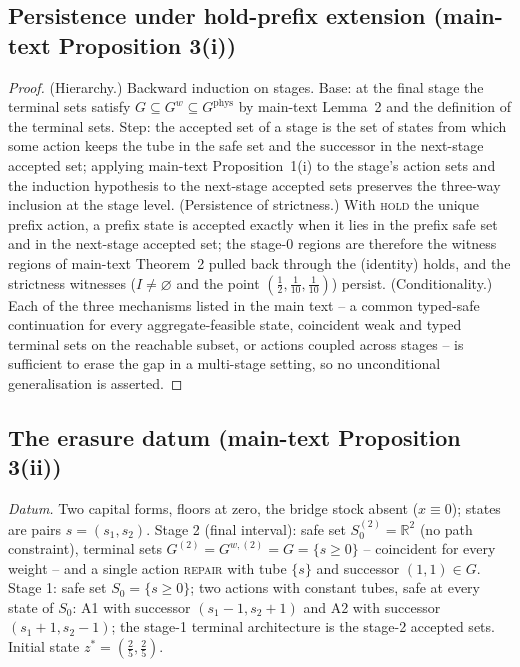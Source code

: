 \documentclass[preprint,11pt,authoryear]{elsarticle}
\theoremstyle{remark}
\newcommand{\act}[1]{\textsc{#1}}
\begin{document}
\subsection{Persistence under hold-prefix extension (main-text Proposition 3(i))}

\begin{proof}
(Hierarchy.) Backward induction on stages. Base: at the final stage the terminal sets satisfy $G\subseteq G^w\subseteq G^{\mathrm{phys}}$ by main-text Lemma~2 and the definition of the terminal sets. Step: the accepted set of a stage is the set of states from which some action keeps the tube in the safe set and the successor in the next-stage accepted set; applying main-text Proposition~1(i) to the stage's action sets and the induction hypothesis to the next-stage accepted sets preserves the three-way inclusion at the stage level.
(Persistence of strictness.) With \act{hold} the unique prefix action, a prefix state is accepted exactly when it lies in the prefix safe set and in the next-stage accepted set; the stage-0 regions are therefore the witness regions of main-text Theorem~2 pulled back through the (identity) holds, and the strictness witnesses ($I\neq\varnothing$ and the point $(\tfrac12,\tfrac1{10},\tfrac1{10})$) persist.
(Conditionality.) Each of the three mechanisms listed in the main text -- a common typed-safe continuation for every aggregate-feasible state, coincident weak and typed terminal sets on the reachable subset, or actions coupled across stages -- is sufficient to erase the gap in a multi-stage setting, so no unconditional generalisation is asserted.
\end{proof}

\subsection{The erasure datum (main-text Proposition 3(ii))}\label{si:erasure}

\emph{Datum.} Two capital forms, floors at zero, the bridge stock absent ($x\equiv0$); states are pairs $s=(s_1,s_2)$. Stage 2 (final interval): safe set $S_0^{(2)}=\mathbb R^2$ (no path constraint), terminal sets $G^{(2)}=G^{w,(2)}=G=\{s\ge0\}$ -- coincident for every weight -- and a single action \act{repair} with tube $\{s\}$ and successor $(1,1)\in G$. Stage 1: safe set $S_0=\{s\ge0\}$; two actions with constant tubes, safe at every state of $S_0$: A1 with successor $(s_1-1,s_2+1)$ and A2 with successor $(s_1+1,s_2-1)$; the stage-1 terminal architecture is the stage-2 accepted sets. Initial state $z^*=(\tfrac25,\tfrac25)$.
\end{document}
